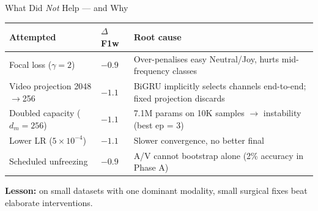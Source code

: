 \documentclass[aspectratio=169,10pt]{beamer}
\begin{document}
\begin{frame}{What Did \emph{Not} Help --- and Why}
  \small
  \begin{tabular}{p{4.5cm}p{2cm}p{6cm}}
    \toprule
    \textbf{Attempted} & \textbf{$\Delta$ F1w} & \textbf{Root cause} \\
    \midrule
    Focal loss ($\gamma = 2$) & $-0.9$ & Over-penalises easy Neutral/Joy, hurts mid-frequency classes \\
    Video projection 2048$\to$256 & $-1.1$ & BiGRU implicitly selects channels end-to-end; fixed projection discards \\
    Doubled capacity ($d_m=256$) & $-1.1$ & 7.1M params on 10K samples $\to$ instability (best ep = 3) \\
    Lower LR ($5{\times}10^{-4}$) & $-1.1$ & Slower convergence, no better final \\
    Scheduled unfreezing & $-0.9$ & A/V cannot bootstrap alone (2\% accuracy in Phase A) \\
    \bottomrule
  \end{tabular}
  \vfill
  \centering
  \textbf{Lesson:} on small datasets with one dominant modality, small surgical fixes beat elaborate interventions.
\end{frame}
\end{document}
